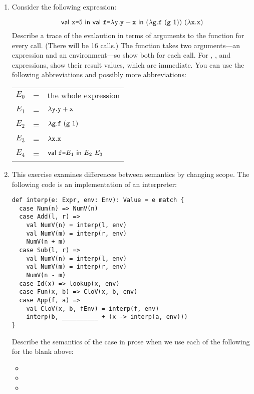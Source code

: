 \begin{enumerate}
\item Consider the following expression:

\[
\ebind{\cx}{5}{
    \ebind{\code{f}}{\efun{\cy}{\eadd{\cy}{\cx}}}{
        \eapp{(\efun{\code{g}}{\eapp{\code{f}}{(\eapp{\code{g}}{1})}})}
        {(\efun{\cx}{\cx})}
    }
}
\]
Describe a trace of the evalaution in terms of arguments to the 
function for every call. (There will be 16 calls.) The  function
takes two arguments---an expression and an environment---so show both for each call.
For , , and  expressions, show their result values, which
are immediate. You can use the following abbreviations and possibly more abbreviations:

\begin{center}
\begin{tabular}{lcl}
$E_0$ & = & the whole expression \\
$E_1$ & = & $\lambda\texttt{y}.\texttt{y}+\texttt{x}$ \\
$E_2$ & = & $\lambda\texttt{g}.\texttt{f}\ (\texttt{g}\ 1)$ \\
$E_3$ & = & $\lambda\texttt{x}.\texttt{x}$ \\
$E_4$ & = & $\textsf{val}\ \texttt{f}\texttt{=} E_1\ \textsf{in}\ E_2\ E_3$
\end{tabular}
\end{center}

\item This exercise examines differences between semantics by changing scope.
The following code is an implementation of an interpreter:

\begin{verbatim}
def interp(e: Expr, env: Env): Value = e match {
  case Num(n) => NumV(n)
  case Add(l, r) =>
    val NumV(n) = interp(l, env)
    val NumV(m) = interp(r, env)
    NumV(n + m)
  case Sub(l, r) =>
    val NumV(n) = interp(l, env)
    val NumV(m) = interp(r, env)
    NumV(n - m)
  case Id(x) => lookup(x, env)
  case Fun(x, b) => CloV(x, b, env)
  case App(f, a) =>
    val CloV(x, b, fEnv) = interp(f, env)
    interp(b, __________ + (x -> interp(a, env)))
}
\end{verbatim}

Describe the semantics of the  case in prose
when we use each of the following for the blank above:
\begin{itemize}
  \item {}
  \item {}
  \item {}
\end{itemize}


\end{enumerate}
